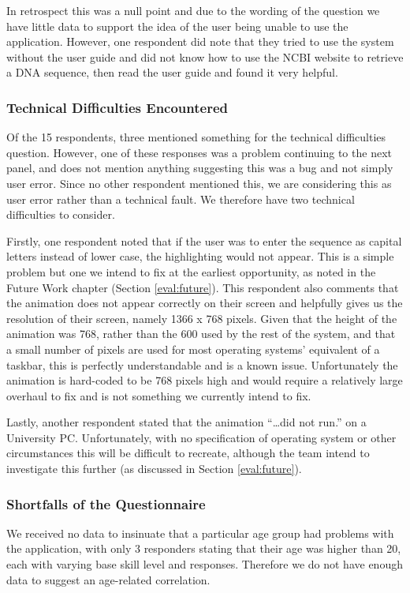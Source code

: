 In retrospect this was a null point and due to the wording of the
question we have little data to support the idea of the user being
unable to use the application.
However, one respondent did note that they tried to use the system
without the user guide and did not know how to use the NCBI website
\cite{ncbi} to retrieve a DNA sequence, then read the user guide and
found it very helpful. 

\subsubsection{Technical Difficulties Encountered}

Of the 15 respondents, three mentioned something for the technical
difficulties question.
However, one of these responses was a problem continuing to the next
panel, and does not mention anything suggesting this was a bug and not
simply user error.
Since no other respondent mentioned this, we are considering this as
user error rather than a technical fault.
We therefore have two technical difficulties to consider.

Firstly, one respondent noted that if the user was to enter the
sequence as capital letters instead of lower case, the highlighting
would not appear.
This is a simple problem but one we intend to fix at the earliest
opportunity, as noted in the Future Work chapter (Section
\ref{eval:future}).
This respondent also comments that the animation does not appear
correctly on their screen and helpfully gives us the resolution of
their screen, namely 1366 x 768 pixels.
Given that the height of the animation was 768, rather than the 600
used by the rest of the system, and that a small number of pixels are
used for most operating systems' equivalent of a taskbar, this is
perfectly understandable and is a known issue.
Unfortunately the animation is hard-coded to be 768 pixels high and
would require a relatively large overhaul to fix and is not something we
currently intend to fix.

Lastly, another respondent stated that the animation ``\ldots did not
run.'' on a University PC.
Unfortunately, with no specification of operating system or other
circumstances this will be difficult to recreate, although the team
intend to investigate this further (as discussed in Section
\ref{eval:future}).

\subsubsection{Shortfalls of the Questionnaire}
We received no data to insinuate that a particular age group had
problems with the application, with only 3 responders stating that
their age was higher than 20, each with varying base skill level and
responses.
Therefore we do not have enough data to suggest an age-related
correlation.

